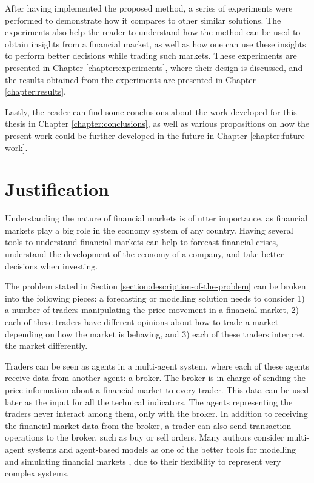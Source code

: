 After having implemented the proposed method, a series of experiments were
performed to demonstrate how it compares to other similar solutions. The
experiments also help the reader to understand how the method can be used to
obtain insights from a financial market, as well as how one can use these
insights to perform better decisions while trading such markets. These
experiments are presented in Chapter \ref{chapter:experiments}, where their
design is discussed, and the results obtained from the experiments are presented
in Chapter \ref{chapter:results}.

Lastly, the reader can find some conclusions about the work developed for this
thesis in Chapter \ref{chapter:conclusions}, as well as various propositions on
how the present work could be further developed in the future in Chapter
\ref{chapter:future-work}.

\section{Justification}
\label{section:justification}

Understanding the nature of financial markets is of utter importance, as
financial markets play a big role in the economy system of any country. Having
several tools to understand financial markets can help to forecast financial
crises, understand the development of the economy of a company, and take better
decisions when investing.

The problem stated in Section \ref{section:description-of-the-problem} can be
broken into the following pieces: a forecasting or modelling solution needs to
consider 1) a number of traders manipulating the price movement in a financial
market, 2) each of these traders have different opinions about how to trade a
market depending on how the market is behaving, and 3) each of these traders
interpret the market differently.

Traders can be seen as agents in a multi-agent system, where each of these
agents receive data from another agent: a broker. The broker is in charge of
sending the price information about a financial market to every trader. This
data can be used later as the input for all the technical indicators. The agents
representing the traders never interact among them, only with the broker. In
addition to receiving the financial market data from the broker, a trader can
also send transaction operations to the broker, such as buy or sell orders. Many
authors consider multi-agent systems and agent-based models as one of the better
tools for modelling and simulating financial markets \cite{Lebaron2001}
\cite{Gamil2007} \cite{Boer-Sorban2008}, due to their flexibility to represent
very complex systems.

